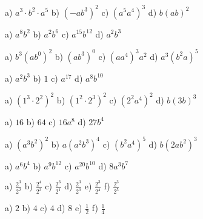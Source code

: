     \begin{tehtava}
        a) $a^3\cdot b^2\cdot a^5$ \qquad
        b) $(-ab^3)^2$ \qquad
        c) $(a^5a^4)^3$ \qquad
        d) $b(ab)^2$

        \begin{vastaus}
            a) $a^8b^2$ \qquad
            b) $a^2b^6$ \qquad
            c) $a^{15}b^{12}$ \qquad
            d) $a^2b^3$
        \end{vastaus}
    \end{tehtava}

    \begin{tehtava}
        a) $b^3(ab^0)^2$ \qquad
        b) $(ab^3)^0$ \qquad
        c) $(aa^4)^3a^2$ \qquad
        d) $a^3(b^2a)^5$

        \begin{vastaus}
            a) $a^2b^3$ \qquad
            b) $1$ \qquad
            c) $a^{17}$ \qquad
            d) $a^8b^{10}$
        \end{vastaus}
    \end{tehtava}

    \begin{tehtava}
        a) $(1^3\cdot 2^2)^2$ \qquad
        b) $(1^2\cdot 2^3)^2$ \qquad
        c) $(2^2a^4)^2$ \qquad
        d) $b(3b)^3$

        \begin{vastaus}
            a) $16$ \qquad
            b) $64$ \qquad
            c) $16a^8$ \qquad
            d) $27b^4$
        \end{vastaus}
    \end{tehtava}
    
    \begin{tehtava}
        a) $(a^3b^2)^2$ \qquad
        b) $a(a^2b^3)^4$ \qquad
        c) $(b^2a^4)^5$ \qquad
        d) $b(2ab^2)^3$
        
        \begin{vastaus}
            a) $a^6b^4$ \qquad
            b) $a^9b^{12}$ \qquad
            c) $a^{20}b^{10}$ \qquad
            d) $8a^3b^7$
        \end{vastaus}
    \end{tehtava}
    
    \begin{tehtava}
        a) $\frac{2^3}{2^2}$ \qquad
        b) $\frac{2^4}{2^2}$ \qquad
        c) $\frac{2^3}{2^1}$ \qquad
        d) $\frac{2^3}{2^0}$ \qquad
        e) $\frac{2^3}{2^4}$ \qquad
        f) $\frac{2^3}{2^5}$
        
        \begin{vastaus}
            a) $2$ \qquad
            b) $4$ \qquad
            c) $4$ \qquad
            d) $8$ \qquad
            e) $\frac{1}{2}$ \qquad
            f) $\frac{1}{4}$
        \end{vastaus}
    \end{tehtava}
    
